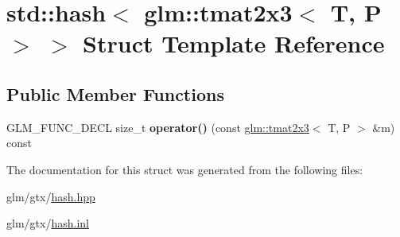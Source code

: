 \hypertarget{structstd_1_1hash_3_01glm_1_1tmat2x3_3_01T_00_01P_01_4_01_4}{\section{std\-:\-:hash$<$ glm\-:\-:tmat2x3$<$ T, P $>$ $>$ Struct Template Reference}
\label{structstd_1_1hash_3_01glm_1_1tmat2x3_3_01T_00_01P_01_4_01_4}
}
\subsection*{Public Member Functions}
\begin{DoxyCompactItemize}
\item 
\hypertarget{structstd_1_1hash_3_01glm_1_1tmat2x3_3_01T_00_01P_01_4_01_4_a929cc46472670879d9a99586f76052ab}{G\-L\-M\-\_\-\-F\-U\-N\-C\-\_\-\-D\-E\-C\-L size\-\_\-t {\bfseries operator()} (const \hyperlink{structglm_1_1tmat2x3}{glm\-::tmat2x3}$<$ T, P $>$ \&m) const }\label{structstd_1_1hash_3_01glm_1_1tmat2x3_3_01T_00_01P_01_4_01_4_a929cc46472670879d9a99586f76052ab}

\end{DoxyCompactItemize}


The documentation for this struct was generated from the following files\-:\begin{DoxyCompactItemize}
\item 
glm/gtx/\hyperlink{hash_8hpp}{hash.\-hpp}\item 
glm/gtx/\hyperlink{hash_8inl}{hash.\-inl}\end{DoxyCompactItemize}
